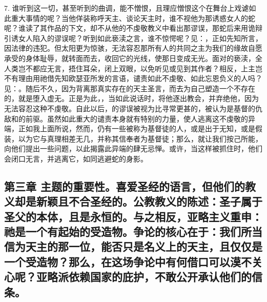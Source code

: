 7. 谁听到这一切，甚至听到的曲调，能不憎恨，且理应憎恨这个在舞台上戏谑如此重大事情的呢？当他佯装称呼天主、谈论天主时，谁不视他为那诱惑女人的蛇呢？谁读了其作品的下文，却不从他的不虔敬教义中看出那谬误，那蛇后来用诡辩引诱女人陷入的谬误呢？听到如此亵渎之言，谁不惊愕呢？见：，正如先知所言，因法律的违犯。但太阳更为惊骇，无法容忍那所有人的共同之主为我们的缘故自愿承受的身体耻辱，就转面而去，收回它的光线，使那日变成无光。面对的亵渎，全人类岂不都应无言，捂住耳朵，闭上双眼，以免听见或见到其作者？相反，上主岂不有理由用祂借先知欧瑟亚所发的言语，谴责如此不虔敬、如此忘恩负义的人吗？见：。随后不久，因为背离那真实存在的天主圣言，而去为自己塑造一个不存在的，就是堕入虚无。正是为此，，当如此说话时，将他逐出教会，并弃绝他，因为无法容忍这种不虔敬。自此以后，的谬误被视为比寻常更甚的，被认为是基督的仇敌和的前驱。虽然如此重大的谴责本身就有特别的力量，使人逃离这不虔敬的异端，正如我上面所说，然而，仍有一些被称为基督徒的人，或是出于无知，或是假装，以为它与真理相差无几，并称其信奉者为基督徒；那么，就让我们按己所能，向他们提出一些问题，以此揭露此异端的肆无忌惮。或许，当这样被抓住时，他们会闭口无言，并逃离它，如同逃避蛇的身影。\par


\subsection{第三章 主题的重要性。喜爱圣经的语言，但他们的教义却是新颖且不合圣经的。公教教义的陈述：圣子属于圣父的本体，且是永恒的。与之相反，亚略主义重申：祂是一个有起始的受造物。争论的核心在于：我们所当信为天主的那一位，能否只是名义上的天主，且仅仅是一个受造物？那么，在这场争论中有何借口可以漠不关心呢？亚略派依赖国家的庇护，不敢公开承认他们的信条。}

